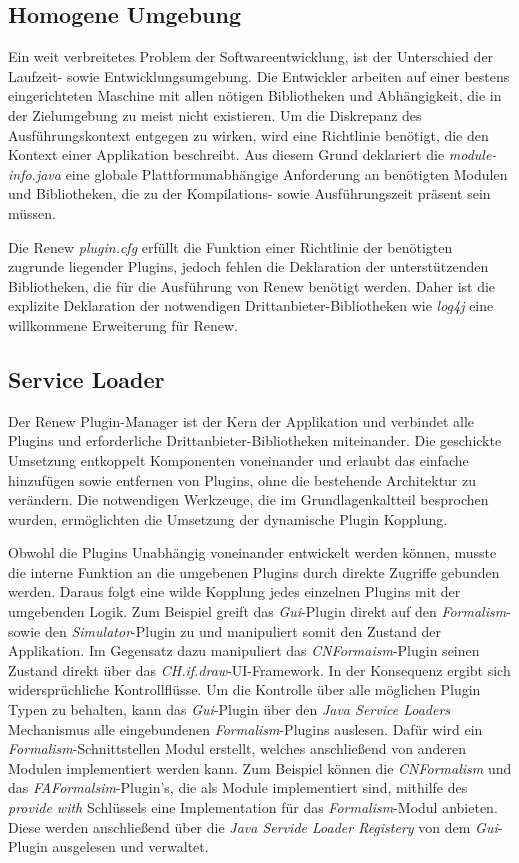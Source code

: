 \subsection{Homogene Umgebung}
	Ein weit verbreitetes Problem der Softwareentwicklung, ist der Unterschied der Laufzeit- sowie Entwicklungsumgebung. Die Entwickler arbeiten auf einer bestens eingerichteten Maschine mit allen nötigen Bibliotheken und Abhängigkeit, die in der Zielumgebung zu meist nicht existieren. Um die Diskrepanz des Ausführungskontext entgegen zu wirken, wird eine Richtlinie benötigt, die den Kontext einer Applikation beschreibt. Aus diesem Grund deklariert die \textit{module-info.java} eine globale Plattformunabhängige Anforderung an benötigten Modulen und Bibliotheken, die zu der Kompilations- sowie Ausführungszeit präsent sein müssen.\bigbreak

	Die Renew \textit{plugin.cfg} erfüllt die Funktion einer Richtlinie der benötigten zugrunde liegender Plugins, jedoch fehlen die Deklaration der unterstützenden Bibliotheken, die für die Ausführung von Renew benötigt werden. Daher ist die explizite Deklaration der notwendigen Drittanbieter-Bibliotheken wie \textit{log4j} eine willkommene Erweiterung für Renew. 

\subsection{Service Loader} 
	Der Renew Plugin-Manager ist der Kern der Applikation und verbindet alle Plugins und erforderliche Drittanbieter-Bibliotheken miteinander. Die geschickte Umsetzung entkoppelt Komponenten voneinander und erlaubt das einfache hinzufügen sowie entfernen von Plugins, ohne die bestehende Architektur zu verändern. Die notwendigen Werkzeuge, die im Grundlagenkaltteil besprochen wurden, ermöglichten die Umsetzung der dynamische Plugin Kopplung. \bigbreak

	Obwohl die Plugins Unabhängig voneinander entwickelt werden können, musste die interne Funktion an die umgebenen Plugins durch direkte Zugriffe gebunden werden. Daraus folgt eine wilde Kopplung jedes einzelnen Plugins mit der umgebenden Logik. Zum Beispiel greift das \textit{Gui}-Plugin direkt auf den \textit{Formalism}- sowie den \textit{Simulator}-Plugin zu und manipuliert somit den Zustand der Applikation. Im Gegensatz dazu manipuliert das \textit{CNFormaism}-Plugin seinen Zustand direkt über das \textit{CH.if.draw}-UI-Framework. In der Konsequenz ergibt sich widersprüchliche Kontrollflüsse.\newline  
	Um die Kontrolle über alle möglichen Plugin Typen zu behalten, kann das \textit{Gui}-Plugin über den \textit{Java Service Loaders} Mechanismus alle eingebundenen \textit{Formalism}-Plugins auslesen. Dafür wird ein \textit{Formalism}-Schnittstellen Modul erstellt, welches anschließend von anderen Modulen implementiert werden kann. Zum Beispiel können die \textit{CNFormalism} und das \textit{FAFormalsim}-Plugin's, die als Module implementiert sind, mithilfe des \textit{provide with} Schlüssels eine Implementation für das \textit{Formalism}-Modul anbieten. Diese werden anschließend über die \textit{Java Servide Loader Registery} von dem \textit{Gui}-Plugin ausgelesen und verwaltet. \bigbreak

